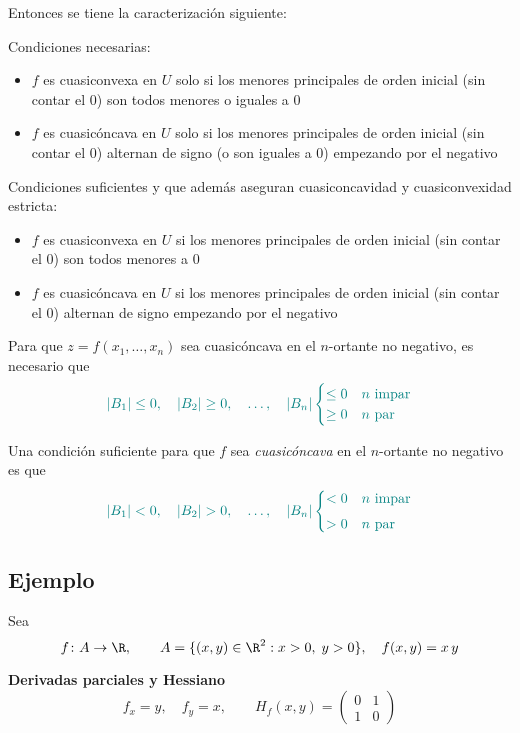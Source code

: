 \documentclass{article}
\begin{document}
\noindent Entonces se tiene la caracterización siguiente:

Condiciones necesarias:
\begin{itemize}
  \item {\color{teal}\(f\) es cuasiconvexa en \(U\) solo si los menores principales de orden inicial (sin contar el 0) son todos menores o iguales a 0}
  \item {\color{teal}\(f\) es cuasicóncava en \(U\) solo si los menores principales de orden inicial (sin contar el 0) alternan de signo (o son iguales a 0) empezando por el negativo}
\end{itemize}

Condiciones suficientes y que además aseguran cuasiconcavidad y cuasiconvexidad estricta:
\begin{itemize}
  \item {\color{teal}\(f\) es cuasiconvexa en \(U\) si los menores principales de orden inicial (sin contar el 0) son todos menores a 0}
  \item {\color{teal}\(f\) es cuasicóncava en \(U\) si los menores principales de orden inicial (sin contar el 0) alternan de signo empezando por el negativo}
\end{itemize}

Para que \(z = f(x_1,\dots,x_n)\) sea cuasicóncava en el \(n\)-ortante no negativo, es necesario que
\[
\color{teal}
|B_1| \le 0,\quad
|B_2| \ge 0,\quad
\dots,\quad
|B_n|
\begin{cases}
\le 0 & n\text{ impar}\\
\ge 0 & n\text{ par}
\end{cases}
\]

Una condición suficiente para que \(f\) sea \emph{cuasicóncava} en el \(n\)-ortante no negativo es que
\[
\color{teal}
|B_1| < 0,\quad
|B_2| > 0,\quad
\dots,\quad
|B_n|
\begin{cases}
< 0 & n\text{ impar}\\[4pt]
> 0 & n\text{ par}
\end{cases}
\]

\subsection*{Ejemplo}

Sea 
\[
f\colon A\to\R,
\qquad
A=\{(x,y)\in\R^2:x>0,\;y>0\},
\quad
f(x,y)=x\,y
\]

\medskip

\noindent\textbf{Derivadas parciales y Hessiano}\\
\[
f_x = y,\quad f_y = x,
\qquad
H_f(x,y)
= \begin{pmatrix}
0 & 1\\[4pt]
1 & 0
\end{pmatrix}
\]
\end{document}
